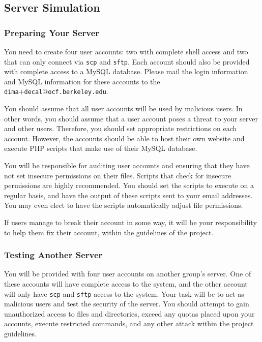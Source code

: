 \documentclass[10pt]{article}
\begin{document}
\subsection{Server Simulation}


\subsubsection{Preparing Your Server}

You need to create four user accounts: two with complete shell access
and two that can only connect via \texttt{scp} and \texttt{sftp}.
Each account should also be provided with complete access to a MySQL
database. Please mail the login information and MySQL information
for these accounts to the \texttt{dima}+\texttt{decal}@\texttt{ocf.berkeley.edu}.

You should assume that all user accounts will be used by malicious
users. In other words, you should assume that a user account poses
a threat to your server and other users. Therefore, you should set
appropriate restrictions on each account. However, the accounts should 
be able to host their own website and execute PHP scripts that make
use of their MySQL database. 

You will be responsible for auditing user accounts and ensuring that
they have not set insecure permissions on their files. Scripts that check for insecure permissions are highly recommended. You should set the
scripts to execute on a regular basis, and have the output of these
scripts sent to your email addresses. You may even elect to have the
scripts automatically adjust file permissions.

If users manage to break their account in some way, it will be your
responsibility to help them fix their account, within the guidelines
of the project. 


\subsubsection{Testing Another Server}

You will be provided with four user accounts on another group's server.
One of these accounts will have complete access to the system, and
the other account will only have \texttt{scp} and \texttt{sftp} access
to the system. Your task will be to act as malicious users and test
the security of the server. You should attempt to gain unauthorized
access to files and directories, exceed any quotas placed upon your
accounts, execute restricted commands, and any other attack within
the project guidelines.
\end{document}
